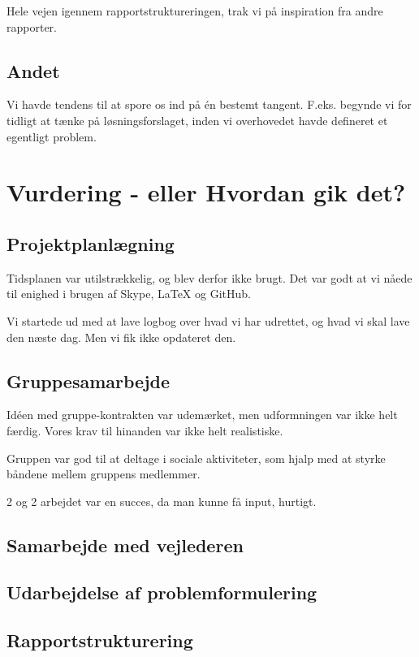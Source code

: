 Hele vejen igennem rapportstruktureringen, trak vi på inspiration fra andre rapporter.

\subsection{Andet}

Vi havde tendens til at spore os ind på én bestemt tangent. F.eks. begynde vi for tidligt at tænke på løsningsforslaget, inden vi overhovedet havde defineret et egentligt problem.

\section{Vurdering - eller Hvordan gik det?}

\subsection{Projektplanlægning}

Tidsplanen var utilstrækkelig, og blev derfor ikke brugt. Det var godt at vi nåede til enighed i brugen af Skype, LaTeX og GitHub.

Vi startede ud med at lave logbog over hvad vi har udrettet, og hvad vi skal lave den næste dag. Men vi fik ikke opdateret den.

\subsection{Gruppesamarbejde}

Idéen med gruppe-kontrakten var udemærket, men udformningen var ikke helt færdig. Vores krav til hinanden var ikke helt realistiske.

Gruppen var god til at deltage i sociale aktiviteter, som hjalp med at styrke båndene mellem gruppens medlemmer.

2 og 2 arbejdet var en succes, da man kunne få input, hurtigt.


\subsection{Samarbejde med vejlederen}

\subsection{Udarbejdelse af problemformulering}



\subsection{Rapportstrukturering}

